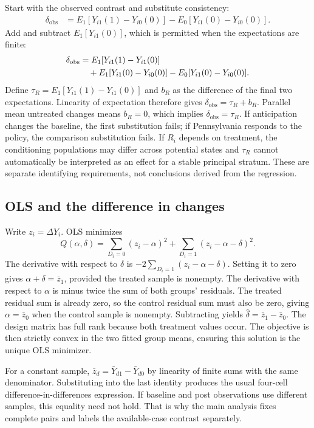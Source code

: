 \documentclass[11pt]{article}
\begin{document}
Start with the observed contrast and substitute consistency:
\begin{align}
\delta_{\mathrm{obs}}
 &=E_1[Y_{i1}(1)-Y_{i0}(0)]
   -E_0[Y_{i1}(0)-Y_{i0}(0)].\label{eq:stepone}
\end{align}
Add and subtract $E_1[Y_{i1}(0)]$, which is permitted when the expectations are finite:
\begin{align}
\delta_{\mathrm{obs}}
 &=E_1[Y_{i1}(1)-Y_{i1}(0)]\notag\\
 &\quad+E_1[Y_{i1}(0)-Y_{i0}(0)]
       -E_0[Y_{i1}(0)-Y_{i0}(0)].\label{eq:steptwo}
\end{align}
Define $\tau_R=E_1[Y_{i1}(1)-Y_{i1}(0)]$ and $b_R$ as the difference of the final two expectations. Linearity of expectation therefore gives $\delta_{\mathrm{obs}}=\tau_R+b_R$. Parallel mean untreated changes means $b_R=0$, which implies $\delta_{\mathrm{obs}}=\tau_R$. If anticipation changes the baseline, the first substitution fails; if Pennsylvania responds to the policy, the comparison substitution fails. If $R_i$ depends on treatment, the conditioning populations may differ across potential states and $\tau_R$ cannot automatically be interpreted as an effect for a stable principal stratum. These are separate identifying requirements, not conclusions derived from the regression. %

\subsection{OLS and the difference in changes}
Write $z_i=\Delta Y_i$. OLS minimizes
\begin{equation}
Q(\alpha,\delta)=\sum_{D_i=0}(z_i-\alpha)^2
 +\sum_{D_i=1}(z_i-\alpha-\delta)^2.
\end{equation}
The derivative with respect to $\delta$ is $-2\sum_{D_i=1}(z_i-\alpha-\delta)$. Setting it to zero gives $\alpha+\delta=\bar z_1$, provided the treated sample is nonempty. The derivative with respect to $\alpha$ is minus twice the sum of both groups' residuals. The treated residual sum is already zero, so the control residual sum must also be zero, giving $\alpha=\bar z_0$ when the control sample is nonempty. Subtracting yields $\widehat\delta=\bar z_1-\bar z_0$. The design matrix has full rank because both treatment values occur. The objective is then strictly convex in the two fitted group means, ensuring this solution is the unique OLS minimizer. %

For a constant sample, $\bar z_d=\bar Y_{d1}-\bar Y_{d0}$ by linearity of finite sums with the same denominator. Substituting into the last identity produces the usual four-cell difference-in-differences expression. If baseline and post observations use different samples, this equality need not hold. That is why the main analysis fixes complete pairs and labels the available-case contrast separately. %
\end{document}
